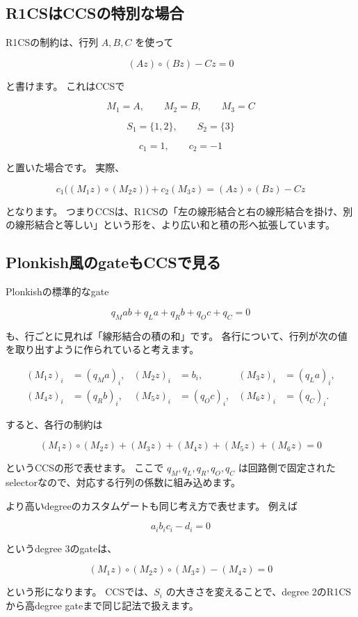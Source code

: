 \documentclass[a4paper,11pt]{ltjsarticle}
\begin{document}
\subsection{R1CSはCCSの特別な場合}

R1CSの制約は、行列 \(A,B,C\) を使って

\[
  (Az)\circ(Bz)-Cz=0
\]

と書けます。
これはCCSで

\[
  M_1=A,\qquad M_2=B,\qquad M_3=C
\]

\[
  S_1=\{1,2\},\qquad S_2=\{3\}
\]

\[
  c_1=1,\qquad c_2=-1
\]

と置いた場合です。
実際、

\[
  c_1\bigl((M_1z)\circ(M_2z)\bigr)
  +
  c_2(M_3z)
  =
  (Az)\circ(Bz)-Cz
\]

となります。
つまりCCSは、R1CSの「左の線形結合と右の線形結合を掛け、別の線形結合と等しい」という形を、より広い和と積の形へ拡張しています。

\subsection{Plonkish風のgateもCCSで見る}

Plonkishの標準的なgate

\[
  q_Mab+q_La+q_Rb+q_Oc+q_C=0
\]

も、行ごとに見れば「線形結合の積の和」です。
各行について、行列が次の値を取り出すように作られていると考えます。

\[
\begin{aligned}
  (M_1z)_i&=(q_Ma)_i, & (M_2z)_i&=b_i, & (M_3z)_i&=(q_La)_i,\\
  (M_4z)_i&=(q_Rb)_i, & (M_5z)_i&=(q_Oc)_i, & (M_6z)_i&=(q_C)_i .
\end{aligned}
\]

すると、各行の制約は

\[
  (M_1z)\circ(M_2z)
  +(M_3z)+(M_4z)+(M_5z)+(M_6z)=0
\]

というCCSの形で表せます。
ここで \(q_M,q_L,q_R,q_O,q_C\) は回路側で固定されたselectorなので、対応する行列の係数に組み込めます。

より高いdegreeのカスタムゲートも同じ考え方で表せます。
例えば

\[
  a_i b_i c_i-d_i=0
\]

というdegree 3のgateは、

\[
  (M_1z)\circ(M_2z)\circ(M_3z)-(M_4z)=0
\]

という形になります。
CCSでは、\(S_i\) の大きさを変えることで、degree 2のR1CSから高degree gateまで同じ記法で扱えます。
\end{document}
